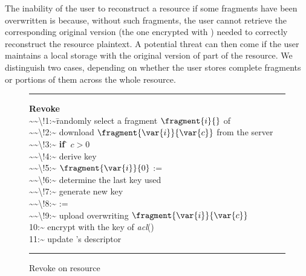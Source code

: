 The inability of the user to reconstruct a resource if some fragments have been overwritten is because, without such fragments, the user cannot retrieve the corresponding original version (the one encrypted with ) needed to correctly reconstruct the resource plaintext. A potential threat can then come if the user maintains a local storage with the original version of part of the resource. We distinguish two cases, depending on whether the user stores complete fragments or portions of them across the whole resource.

\begin{figure}[!t]
\begin{scriptsize}
\hrule          %
\vspace{0.12cm}
\begin{tabbing}
{\bf Revoke}\\    
\num{~~\!1:~}\= randomly select a fragment $\fragment{i}{}$ of \resource  {}\\
\num{~~\!2:~} \1 download $\fragment{\var{i}}{\var{c}}$ from the server \\
\num{~~\!3:~} \1 {\bf if} \= $c> 0$ \mythen {} \\
\num{~~\!4:~} \2 derive key  \\ 
\num{~~\!5:~}  \2 $\fragment{\var{i}}{0}$ :=  \\
\num{~~\!6:~} \1 determine the last key  used   \\
\num{~~\!7:~} \1 generate new key  \\
\num{~~\!8:~} \1  := \\
\num{~~\!9:~} \1 upload  overwriting $\fragment{\var{i}}{\var{c}}$ \\
\num{10:~} \1 encrypt  with the key of {\em acl\/}(\resource) \\
\num{11:~} \1 update  \resource's descriptor 
\end{tabbing}
\vspace{-0.3cm}
\hrule
\end{scriptsize}
\caption{\label{ms:fig:revoke}Revoke on resource \resource}
\end{figure}


